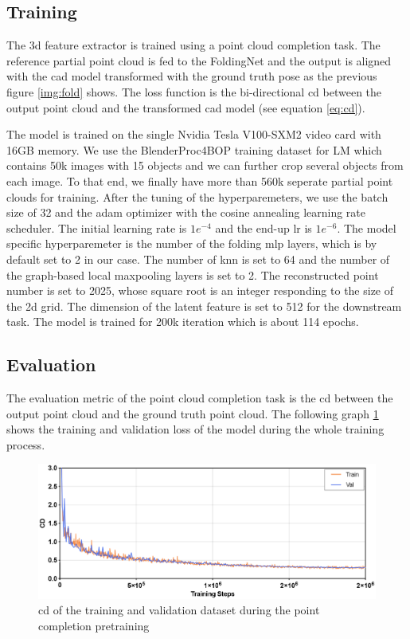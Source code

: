 \documentclass[12pt,DIV14,BCOR12mm,a4paper,footinclude=false,headinclude,parskip=half-,twoside,openright,cleardoublepage=empty,toc=index,bibliography=totoc,listof=totoc]{scrreprt}
\numberwithin{equation}{chapter}
\begin{document}
\subsection{Training} 
The \gls{3d} feature extractor is trained using a point cloud completion task. The reference partial point cloud is fed to the FoldingNet and the output is aligned with the \gls{cad} model transformed with the ground truth pose as the previous figure \ref{img:fold} shows. The loss function is the bi-directional \gls{cd} between the output point cloud and the transformed \gls{cad} model (see equation \ref{eq:cd}).

The model is trained on the single Nvidia Tesla V100-SXM2 video card with 16GB memory. We use the BlenderProc4BOP training dataset for LM which contains 50k images with 15 objects and we can further crop several objects from each image. To that end, we finally have more than 560k seperate partial point clouds for training. After the tuning of the hyperparemeters, we use the batch size of 32 and the \gls{adam} optimizer with the cosine annealing learning rate scheduler. The initial learning rate is $1e^{-4}$ and the end-up \gls{lr} is $1e^{-6}$. The model specific hyperparemeter is the number of the folding \gls{mlp} layers, which is by default set to 2 in our case. The number of \gls{knn} is set to 64 and the number of the graph-based local maxpooling layers is set to 2. The reconstructed point number is set to 2025, whose square root is an integer responding to the size of the \gls{2d} grid. The dimension of the latent feature is set to 512 for the downstream task. The model is trained for 200k iteration which is about 114 epochs.
\subsection{Evaluation} 
The evaluation metric of the point cloud completion task is the \gls{cd} between the output point cloud and the ground truth point cloud. The following graph \ref{img:fold_loss} shows the training and validation loss of the model during the whole training process. 

\begin{figure}[h]
	\centering
	\includegraphics[width=1.\textwidth]{img/fold_loss.eps}
	\caption{\gls{cd} of the training and validation dataset during the point completion pretraining}
	\label{img:fold_loss}
\end{figure}
\end{document}
